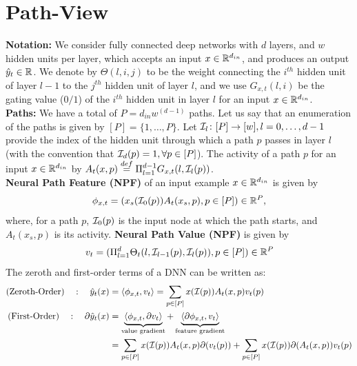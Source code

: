 \section{Path-View}\label{sec:pathgate}
\textbf{Notation:} We consider fully connected deep networks with $d$ layers, and $w$ hidden units per layer, which accepts an input $x\in\mathbb{R}^{d_{in}}$, and produces an output $\hat{y}_{t}\in \mathbb{R}$. We denote by $\Theta(l,i,j)$ to be the weight connecting the $i^{th}$ hidden unit of layer $l-1$ to the $j^{th}$ hidden unit of layer $l$, and we use $G_{x,t}(l,i)$ be the gating value ($0/1$) of the $i^{th}$ hidden unit in layer $l$ for an input $x\in \mathbb{R}^{d_{in}}$.\\
\textbf{Paths:}  We have a total of $P=d_{in}w^{(d-1)}$ paths. Let us say that an enumeration of the paths is given by $[P]=\{1,\ldots,P\}$. Let $\mathcal{I}_{l}\colon [P]\rightarrow [w],l=0,\ldots,d-1$ provide the index of the hidden unit through which a path $p$ passes in layer $l$ (with the convention that $\mathcal{I}_d(p)=1,\forall p\in [P]$). The activity of a path $p$ for an input $x\in \mathbb{R}^{d_{in}}$ by $A_{t}(x,p)\stackrel{def}{=}\Pi_{l=1}^{d-1} G_{x,t}(l,\mathcal{I}_l(p))$.\\
\textbf{Neural Path Feature (NPF)} of an input example $x\in \mathbb{R}^{d_{in}}$ is given by \begin{align}\label{eq:npf}\phi_{x,t}=(x_s(\mathcal{I}_0(p))A_t(x_s,p) ,p\in[P])\in\mathbb{R}^P,\end{align} where, for a path $p$, $\mathcal{I}_0(p)$ is the input node at which the path starts, and $A_t(x_s,p)$ is its activity. %
\textbf{Neural Path Value (NPF)} is given by \begin{align}\label{eq:nfv}v_{t}=(\Pi_{l=1}^d \Theta_t(l,\mathcal{I}_{l-1}(p),\mathcal{I}_l(p)),p\in[P])\in\mathbb{R}^P\end{align}
The zeroth and first-order terms of a DNN can be written as:
\begin{align}
\label{eq:zero}\text{(Zeroth-Order)}\quad: \quad \hat{y}_t(x)&=\langle \phi_{x,t},v_t\rangle=\sum_{p\in [P]}x(\mathcal{I}(p))A_t(x,p)v_t(p)\\
\label{eq:first}\text{(First-Order)}\quad: \quad \partial \hat{y}_t(x)&=\underbrace{\langle \phi_{x,t},\partial v_t\rangle}_{\text{value gradient}}+ \underbrace{\langle \partial\phi_{x,t},v_t\rangle}_{\text{feature gradient}}\\&=\sum_{p\in [P]}x(\mathcal{I}(p)) A_t(x,p) \partial(v_t(p))+\sum_{p\in [P]}x(\mathcal{I}(p)) \partial(A_t(x,p)) v_t(p)\nonumber
\end{align}
